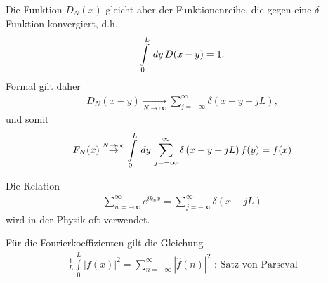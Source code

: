 Die Funktion $D_N(x)$ gleicht aber der Funktionenreihe, die gegen eine
$\delta$-Funktion konvergiert, d.h.
\begin{align*}
\int \limits_{0}^{L} \,dy\, D(x-y) = 1.
\end{align*}
Formal gilt daher
\begin{align*}
D_N(x-y) \underset{N\to\infty}{\rightarrow} \sum \limits_{j=-\infty}^{\infty}
\delta\left(x-y + jL\right),
\end{align*}
und somit
\begin{align*}
F_N(x) \overset{N\to\infty}{\rightarrow} \int \limits_{0}^{L} \,dy\, \sum
\limits_{j=-\infty}^{\infty} \delta\left(x-y + jL\right)f(y) = f(x)
\end{align*}
\begin{Bemerkung}
Die Relation
\begin{align*}
\sum \limits_{n=-\infty}^{\infty} e^{i k_n x} = \sum
\limits_{j=-\infty}^{\infty} \delta\left(x + jL\right)
\end{align*}
wird in der Physik oft verwendet.
\end{Bemerkung}
\begin{Bemerkung}
Für die Fourierkoeffizienten gilt die Gleichung
\begin{align*}
\frac{1}{L} \int \limits_{0}^{L} \left|f(x)\right|^2 = \sum
\limits_{n=-\infty}^{\infty} \left| \hat{f}(n) \right|^2 \text{ : Satz von
Parseval}
\end{align*}
\end{Bemerkung}